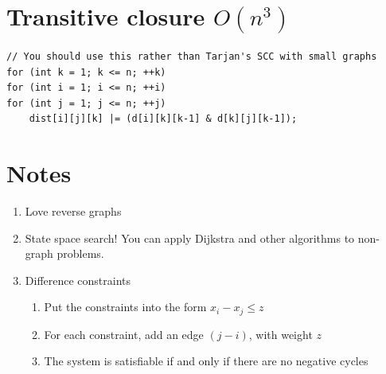 \documentclass[12pt]{book}
\begin{document}
\section{Transitive closure $O(n^3)$}
\begin{verbatim}
// You should use this rather than Tarjan's SCC with small graphs
for (int k = 1; k <= n; ++k)
for (int i = 1; i <= n; ++i)
for (int j = 1; j <= n; ++j)
	dist[i][j][k] |= (d[i][k][k-1] & d[k][j][k-1]);
\end{verbatim}
\section{Notes}
\begin{enumerate}[label = \roman*.]
\item Love reverse graphs
\item State space search! You can apply Dijkstra and other algorithms to non-graph problems.
\item Difference constraints
\begin{enumerate}
\item Put the constraints into the form $x_i - x_j \leq z$
\item For each constraint, add an edge $(j - i)$, with weight $z$
\item The system is satisfiable if and only if there are no negative cycles
\end{enumerate}
\end{enumerate}
\end{document}
